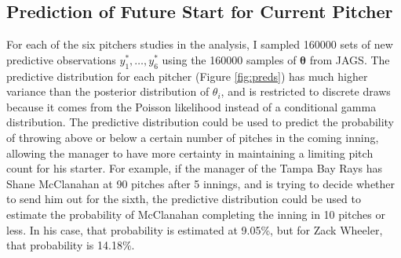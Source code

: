 \documentclass{article}
\begin{document}
\subsection{Prediction of Future Start for Current Pitcher}

For each of the six pitchers studies in the analysis, I sampled 160000 sets of new predictive observations $y^*_1, \hdots, y^*_6$ using the 160000 samples of $\mathbf{\theta}$ from JAGS. The predictive distribution for each pitcher (Figure \ref{fig:preds}) has much higher variance than the posterior distribution of $\theta_i$, and is restricted to discrete draws because it comes from the Poisson likelihood instead of a conditional gamma distribution. The predictive distribution could be used to predict the probability of throwing above or below a certain number of pitches in the coming inning, allowing the manager to have more certainty in maintaining a limiting pitch count for his starter. For example, if the manager of the Tampa Bay Rays has Shane McClanahan at 90 pitches after 5 innings, and is trying to decide whether to send him out for the sixth, the predictive distribution could be used to estimate the probability of McClanahan completing the inning in 10 pitches or less. In his case, that probability is estimated at 9.05\%, but for Zack Wheeler, that probability is 14.18\%.
\end{document}
